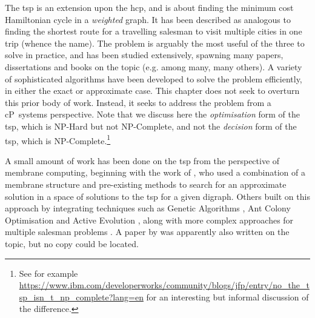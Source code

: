 The \gls{tsp} is an extension upon the \gls{hcp}, and is about finding the minimum cost Hamiltonian cycle in a \emph{weighted} graph.  It has been described as analogous to finding the shortest route for a travelling salesman to visit multiple cities in one trip (whence the name).  The problem is arguably the most useful of the three to solve in practice, and has been studied extensively, spawning many papers, dissertations and books on the topic (e.g. \cite{Smith2017,Ezugwu2017,Cook2012,Applegate2006} among many, many others).  A variety of sophisticated algorithms have been developed to solve the problem efficiently, in either the exact or approximate case.  This chapter does not seek to overturn this prior body of work.  Instead, it seeks to address the problem from a cP~systems perspective.  Note that we discuss here the \emph{optimisation} form of the \gls{tsp}, which is NP-Hard but not NP-Complete, and not the \emph{decision} form of the \gls{tsp}, which is NP-Complete.\footnote{See for example \url{https://www.ibm.com/developerworks/community/blogs/jfp/entry/no_the_tsp_isn_t_np_complete?lang=en} for an interesting but informal discussion of the difference.}


A small amount of work has been done on the \gls{tsp} from the perspective of membrane computing, beginning with the work of \citeauthor{Nishida2006} \cite{Nishida2006}, who used a combination of a membrane structure and pre-existing methods to search for an approximate solution in a space of solutions to the \gls{tsp} for a given digraph.  Others built on this approach by integrating techniques such as Genetic Algorithms \cite{Manalastas2013,He2014}, Ant Colony Optimisation \cite{Zhang2011} and Active Evolution \cite{Song2015}, along with more complex approaches for multiple salesman problems \cite{He2015}.  A paper by \citeauthor{Chen2011} \cite{Chen2011} was apparently also written on the topic, but no copy could be located.

